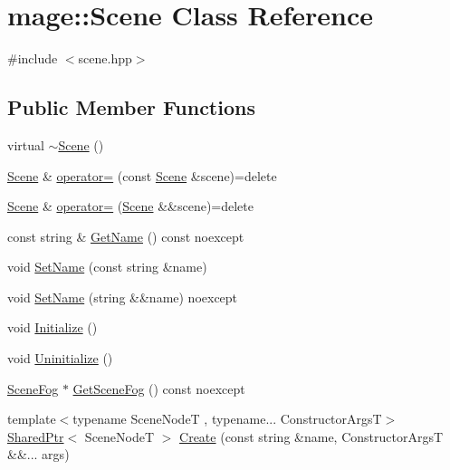 \hypertarget{classmage_1_1_scene}{}\section{mage\+:\+:Scene Class Reference}
\label{classmage_1_1_scene}


{\ttfamily \#include $<$scene.\+hpp$>$}

\subsection*{Public Member Functions}
\begin{DoxyCompactItemize}
\item 
virtual \hyperlink{classmage_1_1_scene_adc40910fdca62586659c2961fe7e7f3c}{$\sim$\+Scene} ()
\item 
\hyperlink{classmage_1_1_scene}{Scene} \& \hyperlink{classmage_1_1_scene_a2c25c0fedc0230771d8c00a8288a69ce}{operator=} (const \hyperlink{classmage_1_1_scene}{Scene} \&scene)=delete
\item 
\hyperlink{classmage_1_1_scene}{Scene} \& \hyperlink{classmage_1_1_scene_a400926762670c9cd9b6d456291600f53}{operator=} (\hyperlink{classmage_1_1_scene}{Scene} \&\&scene)=delete
\item 
const string \& \hyperlink{classmage_1_1_scene_a6afd25c30d08eb579eb430af49cf8fc0}{Get\+Name} () const noexcept
\item 
void \hyperlink{classmage_1_1_scene_a9b7c1c2f84cc3b3c5ff3de4f29d830e9}{Set\+Name} (const string \&name)
\item 
void \hyperlink{classmage_1_1_scene_a86b2e6e764ee134af1706f90603a6596}{Set\+Name} (string \&\&name) noexcept
\item 
void \hyperlink{classmage_1_1_scene_a3cd12ef381ca743bf0b8f8aa2a76eb57}{Initialize} ()
\item 
void \hyperlink{classmage_1_1_scene_a714dc33c04dc2b8e2cec93564905b174}{Uninitialize} ()
\item 
\hyperlink{structmage_1_1_scene_fog}{Scene\+Fog} $\ast$ \hyperlink{classmage_1_1_scene_a1f21d92feb659477ceb4642322fa2f0c}{Get\+Scene\+Fog} () const noexcept
\item 
{\footnotesize template$<$typename Scene\+NodeT , typename... Constructor\+ArgsT$>$ }\\\hyperlink{namespacemage_a1e01ae66713838a7a67d30e44c67703e}{Shared\+Ptr}$<$ Scene\+NodeT $>$ \hyperlink{classmage_1_1_scene_abfce90d15a9aa5b5e05709b35286de88}{Create} (const string \&name, Constructor\+ArgsT \&\&... args)

\end{DoxyCompactItemize}
